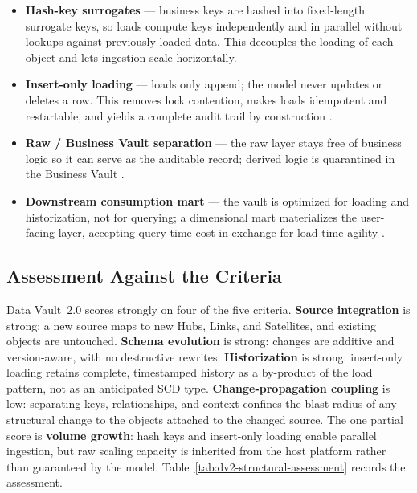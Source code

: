 \begin{itemize}[noitemsep, topsep=4pt]
  \item \textbf{Hash-key surrogates} --- business keys are hashed into fixed-length surrogate keys, so loads compute keys independently and in parallel without lookups against previously loaded data. This decouples the loading of each object and lets ingestion scale horizontally.
  \item \textbf{Insert-only loading} --- loads only append; the model never updates or deletes a row. This removes lock contention, makes loads idempotent and restartable, and yields a complete audit trail by construction \parencite{vassiliadis2009}.
  \item \textbf{Raw / Business Vault separation} --- the raw layer stays free of business logic so it can serve as the auditable record; derived logic is quarantined in the Business Vault \parencite{linstedt2015}.
  \item \textbf{Downstream consumption mart} --- the vault is optimized for loading and historization, not for querying; a dimensional mart materializes the user-facing layer, accepting query-time cost in exchange for load-time agility \parencite{kimball2013}.
\end{itemize}

\subsection{Assessment Against the Criteria}
\label{subsec:ch1-dv2-assess}

Data Vault~2.0 scores strongly on four of the five criteria. \textbf{Source integration} is strong: a new source maps to new Hubs, Links, and Satellites, and existing objects are untouched. \textbf{Schema evolution} is strong: changes are additive and version-aware, with no destructive rewrites. \textbf{Historization} is strong: insert-only loading retains complete, timestamped history as a by-product of the load pattern, not as an anticipated SCD type. \textbf{Change-propagation coupling} is low: separating keys, relationships, and context confines the blast radius of any structural change to the objects attached to the changed source. The one partial score is \textbf{volume growth}: hash keys and insert-only loading enable parallel ingestion, but raw scaling capacity is inherited from the host platform rather than guaranteed by the model. Table~\ref{tab:dv2-structural-assessment} records the assessment.

